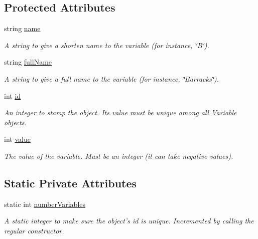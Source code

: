 \subsection*{Protected Attributes}
\begin{DoxyCompactItemize}
\item 
string \hyperlink{classghost_1_1Variable_a05cf4a4cd3a5c033028e0b0f11d1dafd}{name}
\begin{DoxyCompactList}\small\item\em A string to give a shorten name to the variable (for instance, \char`\"{}\-B\char`\"{}). \end{DoxyCompactList}\item 
string \hyperlink{classghost_1_1Variable_a87dc1fa73726f887a7ecbd5b9bfa7cab}{full\-Name}
\begin{DoxyCompactList}\small\item\em A string to give a full name to the variable (for instance, \char`\"{}\-Barracks\char`\"{}). \end{DoxyCompactList}\item 
int \hyperlink{classghost_1_1Variable_a3b1cd0e87cecbb58e115a9000be26f28}{id}
\begin{DoxyCompactList}\small\item\em An integer to stamp the object. Its value must be unique among all \hyperlink{classghost_1_1Variable}{Variable} objects. \end{DoxyCompactList}\item 
int \hyperlink{classghost_1_1Variable_a4623be8dd7ed2a0cb7033aec42033cb7}{value}
\begin{DoxyCompactList}\small\item\em The value of the variable. Must be an integer (it can take negative values). \end{DoxyCompactList}\end{DoxyCompactItemize}
\subsection*{Static Private Attributes}
\begin{DoxyCompactItemize}
\item 
static int \hyperlink{classghost_1_1Variable_a6c9862568c3f951afc4ef8dc75b874cf}{number\-Variables}
\begin{DoxyCompactList}\small\item\em A static integer to make sure the object's id is unique. Incremented by calling the regular constructor. \end{DoxyCompactList}\end{DoxyCompactItemize}
